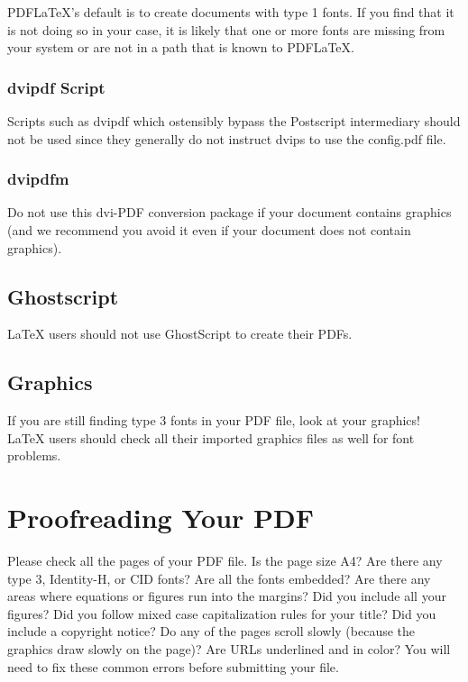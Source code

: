 \documentclass[letterpaper]{article}
\begin{document}
PDF\LaTeX{}'s default is to create documents with type 1 fonts. If you find that it is not doing so in your case, it is likely that one or more fonts are missing from your system or are not in a path that is known to PDF\LaTeX{}.

\subsubsection{dvipdf Script}
Scripts such as dvipdf which ostensibly bypass the Postscript intermediary should not be used since they generally do not instruct dvips to use the config.pdf file.

\subsubsection{dvipdfm}
Do not use this dvi-PDF conversion package if your document contains graphics (and we recommend you avoid it even if your document does not contain graphics).

\subsection{Ghostscript}
\LaTeX{} users should not use GhostScript to create their PDFs.

\subsection{Graphics}
If you are still finding type 3 fonts in your PDF file, look at your graphics! \LaTeX{} users should check all their imported graphics files as well for font problems.

\section{Proofreading Your PDF}
Please check all the pages of your PDF file. Is the page size A4? Are there any type 3, Identity-H, or CID fonts? Are all the fonts embedded? Are there any areas where equations or figures run into the margins? Did you include all your figures? Did you follow mixed case capitalization rules for your title? Did you include a copyright notice? Do any of the pages scroll slowly (because the graphics draw slowly on the page)? Are URLs underlined and in color? You will need to fix these common errors before submitting your file. 
\end{document}

